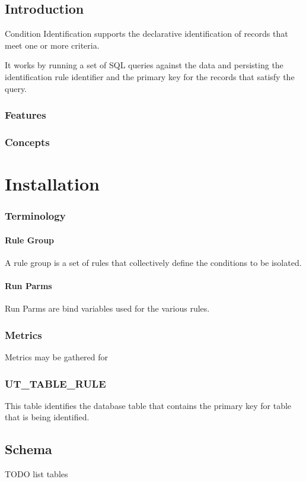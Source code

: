 
\chapter{Introduction}
Condition Identification supports the declarative identification of records that meet one or more criteria.

It works by running a set of SQL queries against the data and persisting the identification rule identifier and
the primary key for the records that satisfy the query.

\section{Features}


\section{Concepts}
\part{Installation}

\section{Terminology}
\subsection{Rule Group}
A rule group is a set of rules that collectively define the conditions to be isolated.
\subsection{Run Parms}
Run Parms are bind variables used for the various rules.
\section{Metrics}
Metrics may be gathered for 
\section{UT_TABLE_RULE}
This table identifies the database table that contains the primary key for table that is being identified.

\chapter{Schema}
TODO list tables

